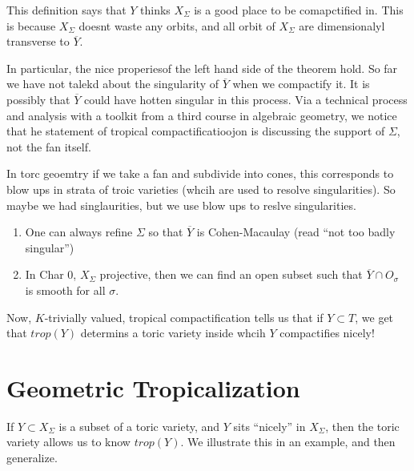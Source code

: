 \documentclass[11pt]{article}
\theoremstyle{definition}
\theoremstyle{plain}%
\theoremstyle{definition}
\begin{document}
This definition says that $Y$ thinks $X_\Sigma$ is a good place to be comapctified in. This is because $X_\Sigma$ doesnt waste any orbits, and all orbit of $X_\Sigma$ are dimensionalyl transverse to $\overline{Y}$.


In particular, the nice properiesof the left hand side of the theorem hold. So far we have not talekd about the singularity of $\overline{Y}$ when we compactify it. It is possibly that $\overline{Y}$ could have hotten singular in this process. Via a technical process and analysis with a toolkit from a third course in algebraic geometry, we notice that he statement of tropical compactificatioojon is discussing the support of $\Sigma$, not the fan itself.


In torc geoemtry if we take a fan and subdivide into cones, this corresponds to blow ups in strata of troic varieties (whcih are used to resolve singularities). So maybe we had singlaurities, but we use blow ups to reslve singularities.

\begin{enumerate}
    \item One can always refine $\Sigma$ so that $\overline{Y}$ is Cohen-Macaulay (read ``not too badly singular'')
    \item In Char 0, $X_\Sigma$ projective, then we can find an open subset such that $\overline{Y} \cap O_\sigma$ is smooth for all $\sigma$.
\end{enumerate}






Now, $K$-trivially valued, tropical compactification tells us that if $Y \subset T$, we get that $trop(Y)$ determins a toric variety inside whcih $Y$ compactifies nicely!

\section{Geometric Tropicalization}

If $Y\subset X_\Sigma$ is  a subset of a toric variety, and $Y$ sits ``nicely'' in $X_\Sigma$, then the toric variety allows us to know $trop(Y)$. We illustrate this in an example, and then generalize.
\end{document}
